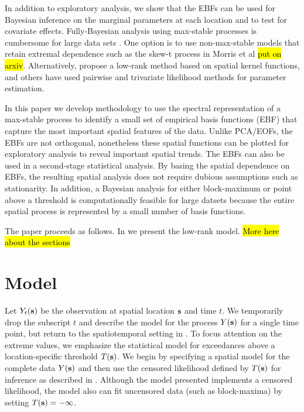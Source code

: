 \documentclass[11pt]{article}
\begin{document}
In addition to exploratory analysis, we show that the EBFs can be used for Bayesian inference on the marginal parameters at each location and to test for covariate effects.
Fully-Bayesian analysis using max-stable processes is cumbersome for large data sets \citep{Wadsworth2014,Thibaud2013a}.
One option is to use non-max-stable models that retain extremal dependence such as the skew-t process in Morris et al \hl{put on arxiv}.
Alternatively, \citet{Reich2012} propose a low-rank method based on spatial kernel functions, and others have used pairwise \citep{Padoan2010,Huser2014} and trivariate \citep{Genton2011} likelihood methods for parameter estimation.

In this paper we develop methodology to use the spectral representation of a max-stable process to identify a small set of empirical basis functions (EBF) that capture the most important spatial features of the data.
Unlike PCA/EOFs, the EBFs are not orthogonal, nonetheless these spatial functions can be plotted for exploratory analysis to reveal important spatial trends.
The EBFs can also be used in a second-stage statistical analysis.
By basing the spatial dependence on EBFs, the resulting spatial analysis does not require dubious assumptions such as stationarity.
In addition, a Bayesian analysis for either block-maximum or point above a threshold is computationally feasible for large datsets because the entire spatial process is represented by a small number of basis functions.

The paper proceeds as follows. In  we present the low-rank model. \hl{More here about the sections}

\section{Model}\label{ebs:model}

Let $Y_{t}(\mbox{\bf s})$ be the observation at spatial location $\mbox{\bf s}$ and time $t$.  We temporarily drop the subscript $t$ and describe the model for the process $Y(\mbox{\bf s})$ for a single time point, but return to the spatiotemporal setting in .
To focus attention on the extreme values, we emphasize the statistical model for exceedances above a location-specific threshold $T(\mbox{\bf s})$.
We begin by specifying a spatial model for the complete data $Y(\mbox{\bf s})$ and then use the censored likelihood defined by $T(\mbox{\bf s})$ for inference as described in .
Although the model presented implements a censored likelihood, the model also can fit uncensored data (such as block-maxima) by setting $T(\mbox{\bf s}) = -\infty$.
\end{document}
